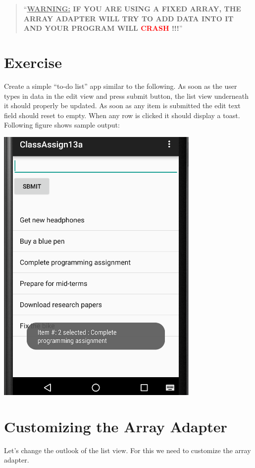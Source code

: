 \vskip 5mm
\begin{quote}
	``\textbf{\underline{WARNING:} IF YOU ARE USING A FIXED ARRAY, THE ARRAY ADAPTER WILL TRY TO ADD DATA INTO IT AND YOUR PROGRAM WILL \textcolor{red}{CRASH} !!!}''
\end{quote}

\section{Exercise}

Create a simple ``to-do list'' app similar to the following. As soon as the user types in data in the edit view and press submit button, the list view underneath it should properly be updated. As soon as any item is submitted the edit text field should reset to empty. When any row is clicked it should display a toast. Following figure shows sample output:

\begin{center}
	\includegraphics[scale=0.4]{chapters/ch10/images/35}
\end{center}


\section{Customizing the Array Adapter}
Let's change the outlook of the list view. For this we need to customize the array adapter. 

